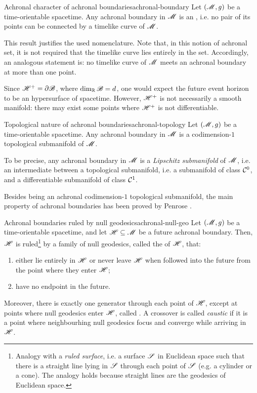 \begin{proposition}{Achronal character of achronal boundaries}{achronal-boundary}
  Let $ (\mathscr{M} , g) $ be a time-orientable spacetime. Any achronal boundary in $ \mathscr{M} $ is an , i.e. no pair of its points can be connected by a timelike curve of $ \mathscr{M} $.
\end{proposition}

This result justifies the used nomenclature. Note that, in this notion of achronal set, it is not required that the timelike curve lies entirely in the set. Accordingly, an analogous statement is: no timelike curve of $ \mathscr{M} $ meets an achronal boundary at more than one point.

Since $ \mathscr{H}^+ = \partial \mathscr{B} $, where $ \dim_{\mathbb{R}} \mathscr{B} = d $, one would expect the future event horizon to be an hypersurface of spacetime. However, $ \mathscr{H}^+ $ is not necessarily a smooth manifold: there may exist some points where $ \mathscr{H}^+ $ is not differentiable.

\begin{proposition}{Topological nature of achronal boundaries}{achronal-topology}
  Let $ (\mathscr{M} , g) $ be a time-orientable spacetime. Any achronal boundary in $ \mathscr{M} $ is a codimension-$ 1 $ topological submanifold of $ \mathscr{M} $.
\end{proposition}

To be precise, any achronal boundary in $ \mathscr{M} $ is a \emph{Lipschitz submanifold} of $ \mathscr{M} $, i.e. an intermediate between a topological submanifold, i.e. a submanifold of class $ \mathcal{C}^{0} $, and a differentiable submanifold of class $ \mathcal{C}^{1} $.

Besides being an achronal codimension-$ 1 $ topological submanifold, the main property of achronal boundaries has been proved by Penrose \cite{penrose-4}.

\begin{theorem}{Achronal boundaries ruled by null geodesics}{achronal-null-geo}
  Let $ (\mathscr{M} , g) $ be a time-orientable spacetime, and let $ \mathscr{H} \subseteq \mathscr{M} $ be a future achronal boundary. Then, $ \mathscr{H} $ is ruled\footnote{Analogy with a \emph{ruled surface}, i.e. a surface $ \mathscr{S} $ in Euclidean space such that there is a straight line lying in $ \mathscr{S} $ through each point of $ \mathscr{S} $ (e.g. a cylinder or a cone). The analogy holds because straight lines are the geodesics of Euclidean space.} by a family of null geodesics, called the  of $ \mathscr{H} $, that:
  \begin{enumerate}
    \item \label{item:fehrng-1} either lie entirely in $ \mathscr{H} $ or never leave $ \mathscr{H} $ when followed into the future from the point where they enter $ \mathscr{H} $;
    \item \label{item:fehrng-2} have no endpoint in the future.
  \end{enumerate}
  Moreover, there is exactly one generator through each point of $ \mathscr{H} $, except at points where null geodesics enter $ \mathscr{H} $, called . A crossover is called \emph{caustic} if it is a point where neighbourhing null geodesics focus and converge while arriving in $ \mathscr{H} $.
\end{theorem}

